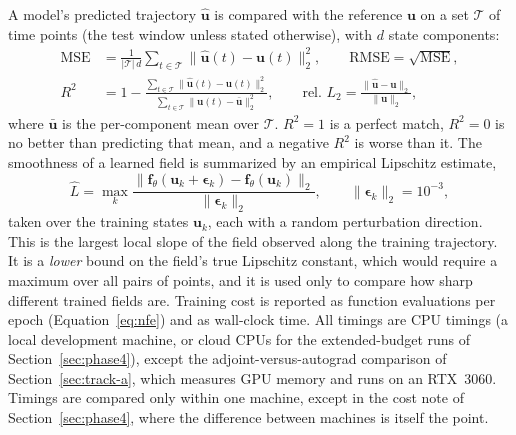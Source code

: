 A model's predicted trajectory $\hat{\mathbf u}$ is compared with the
reference $\mathbf u$ on a set $\mathcal T$ of time points (the test window
unless stated otherwise), with $d$ state components:
\begin{align}
\mathrm{MSE}&=\frac{1}{|\mathcal T|\,d}\sum_{t\in\mathcal T}\lVert\hat{\mathbf u}(t)-\mathbf u(t)\rVert_2^2,
\qquad \mathrm{RMSE}=\sqrt{\mathrm{MSE}},\label{eq:metric-mse}\\
R^2&=1-\frac{\sum_{t\in\mathcal T}\lVert\hat{\mathbf u}(t)-\mathbf u(t)\rVert_2^2}{\sum_{t\in\mathcal T}\lVert\mathbf u(t)-\bar{\mathbf u}\rVert_2^2},
\qquad
\text{rel.\ }L_2=\frac{\lVert\hat{\mathbf u}-\mathbf u\rVert_2}{\lVert\mathbf u\rVert_2},\label{eq:metric-r2}
\end{align}
where $\bar{\mathbf u}$ is the per-component mean over $\mathcal T$. $R^2=1$
is a perfect match, $R^2=0$ is no better than predicting that mean, and a
negative $R^2$ is worse than it. The smoothness of a learned field is
summarized by an empirical Lipschitz estimate,
\begin{equation}
\hat L=\max_{k}\frac{\lVert\mathbf f_\theta(\mathbf u_k+\boldsymbol\epsilon_k)-\mathbf f_\theta(\mathbf u_k)\rVert_2}{\lVert\boldsymbol\epsilon_k\rVert_2},
\qquad \lVert\boldsymbol\epsilon_k\rVert_2=10^{-3},
\label{eq:lipschitz}
\end{equation}
taken over the training states $\mathbf u_k$, each with a random perturbation
direction. This is the largest local slope of the field observed along the
training trajectory. It is a \emph{lower} bound on the field's true Lipschitz
constant, which would require a maximum over all pairs of points, and it is
used only to compare how sharp different trained fields are. Training cost
is reported as function evaluations per epoch (Equation~\ref{eq:nfe}) and as
wall-clock time. All timings are CPU timings (a local development machine,
or cloud CPUs for the extended-budget runs of Section~\ref{sec:phase4}),
except the adjoint-versus-autograd comparison of Section~\ref{sec:track-a},
which measures GPU memory and runs on an RTX~3060. Timings are compared
only within one machine, except in the cost note of Section~\ref{sec:phase4},
where the difference between machines is itself the point.

\FloatBarrier
